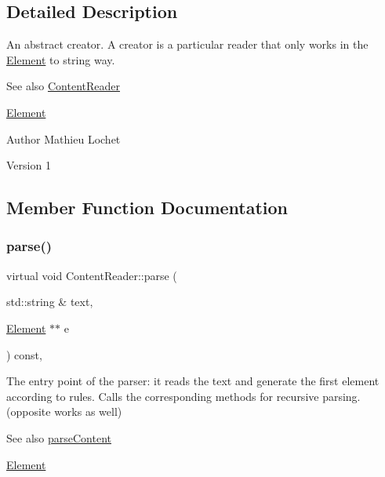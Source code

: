 \subsection{Detailed Description}
An abstract creator. A creator is a particular reader that only works in the \mbox{\hyperlink{classElement}{Element}} to string way. \begin{DoxySeeAlso}{See also}
\mbox{\hyperlink{classContentReader}{Content\+Reader}} 

\mbox{\hyperlink{classElement}{Element}}
\end{DoxySeeAlso}
\begin{DoxyAuthor}{Author}
Mathieu Lochet 
\end{DoxyAuthor}
\begin{DoxyVersion}{Version}
1 
\end{DoxyVersion}


\subsection{Member Function Documentation}
\mbox{\label{classContentReader_a7fff2e63a2e8fa216665604f69974e1d}} 
\subsubsection{\texorpdfstring{parse()}{parse()}}
{\footnotesize\ttfamily virtual void Content\+Reader\+::parse (\begin{DoxyParamCaption}\item[{std\+::string \&}]{text,  }\item[{\mbox{\hyperlink{classElement}{Element}} $\ast$$\ast$}]{e }\end{DoxyParamCaption}) const\hspace{0.3cm}{\ttfamily [pure virtual]}, {\ttfamily [inherited]}}

The entry point of the parser\+: it reads the text and generate the first element according to rules. Calls the corresponding methods for recursive parsing. (opposite works as well) \begin{DoxySeeAlso}{See also}
\mbox{\hyperlink{classContentReader_a7eef37b8b9761e21c0a3907ff94c72f7}{parse\+Content}} 

\mbox{\hyperlink{classElement}{Element}}
\end{DoxySeeAlso}

